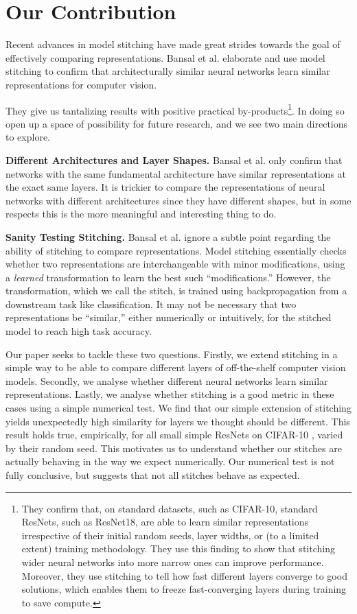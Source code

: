\documentclass{article} %
\begin{document}
\section{Our Contribution}
\label{Contribution}
Recent advances in model stitching \cite{Bansal2021RevisitingMS} have made great strides towards the goal of effectively
comparing representations. Bansal et al. elaborate and use model stitching to confirm that architecturally similar
neural networks learn similar representations for computer vision.

They give us tantalizing results with positive practical by-products\footnote{
   They confirm that, on standard datasets, such as CIFAR-10, standard ResNets, such as ResNet18, are able to learn similar
   representations irrespective of their initial random seeds, layer widths, or (to a limited extent) training methodology.
   They use this finding to show that stitching wider neural networks into more narrow ones can improve performance. Moreover,
   they use stitching to tell how fast different layers converge to good solutions, which enables them to freeze
   fast-converging layers during training to save compute.
}.
In doing so open up a space of possibility for future research, and we see two main directions to explore.

\textbf{Different Architectures and Layer Shapes.} Bansal et al. only confirm that networks with the same 
fundamental architecture have similar representations at
the exact same layers. It is trickier to compare the representations of neural networks with different architectures
since they have different shapes, but in some respects this is the more meaningful and interesting thing to do.

\textbf{Sanity Testing Stitching.} Bansal et al. ignore a subtle point regarding the ability 
of stitching to compare representations. Model stitching essentially checks whether two representations
are interchangeable with minor modifications, using a \textit{learned} transformation to learn the best
such ``modifications.'' However, the transformation, which we call the stitch, is trained using backpropagation
from a downstream task like classification. It may not be necessary that two representations be ``similar,'' either
numerically or intuitively, for the stitched model to reach high task accuracy.

Our paper seeks to tackle these two questions. Firstly, we extend stitching in a simple way to be able to compare
different layers of off-the-shelf computer vision models. Secondly, we analyse 
whether different neural networks learn similar
representations. Lastly, we analyse whether stitching is a good metric in these cases using a simple numerical test. We
find that our simple extension of stitching yields unexpectedly high similarity for layers we thought should be different.
This result holds true, empirically, for all small simple ResNets \cite{He2016DeepRL} on CIFAR-10 \cite{CIFAR10},
varied by their random seed. This motivates
us to understand whether our stitches are actually behaving in the way we expect numerically. Our numerical test is not
fully conclusive, but suggests that not all stitches behave as expected.
\end{document}
